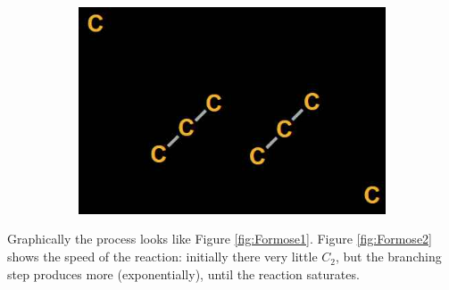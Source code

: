 \documentclass[]{article}
\begin{document}
\begin{figure}[H]
\begin{subfigure}[h]{0.45\textwidth}
		\includegraphics[width=\textwidth]{FormoseStep5}
	\end{subfigure}
\end{figure}

 Graphically the process looks like Figure \ref{fig:Formose1}. Figure \ref{fig:Formose2} shows the speed of the reaction: initially there very little $C_2$, but the branching step produces more (exponentially), until the reaction saturates.  
 
\end{document}
